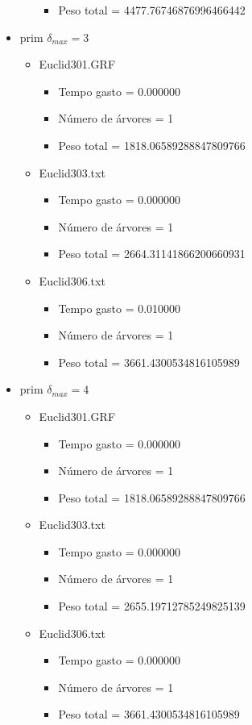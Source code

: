\begin{itemize}
\begin{itemize}
\begin{itemize}
\item Peso total = 4477.76746876996466442
\end{itemize}
\end{itemize}
\item prim $\delta_{max}=3$
\begin{itemize}
\item Euclid301.GRF
\begin{itemize}
\item Tempo gasto = 0.000000
\item Número de árvores = 1
\item Peso total = 1818.06589288847809766
\end{itemize}
\item Euclid303.txt
\begin{itemize}
\item Tempo gasto = 0.000000
\item Número de árvores = 1
\item Peso total = 2664.31141866200660931
\end{itemize}
\item Euclid306.txt
\begin{itemize}
\item Tempo gasto = 0.010000
\item Número de árvores = 1
\item Peso total = 3661.4300534816105989
\end{itemize}
\end{itemize}
\item prim $\delta_{max}=4$
\begin{itemize}
\item Euclid301.GRF
\begin{itemize}
\item Tempo gasto = 0.000000
\item Número de árvores = 1
\item Peso total = 1818.06589288847809766
\end{itemize}
\item Euclid303.txt
\begin{itemize}
\item Tempo gasto = 0.000000
\item Número de árvores = 1
\item Peso total = 2655.19712785249825139
\end{itemize}
\item Euclid306.txt
\begin{itemize}
\item Tempo gasto = 0.000000
\item Número de árvores = 1
\item Peso total = 3661.4300534816105989
\end{itemize}
\end{itemize}
\end{itemize}
